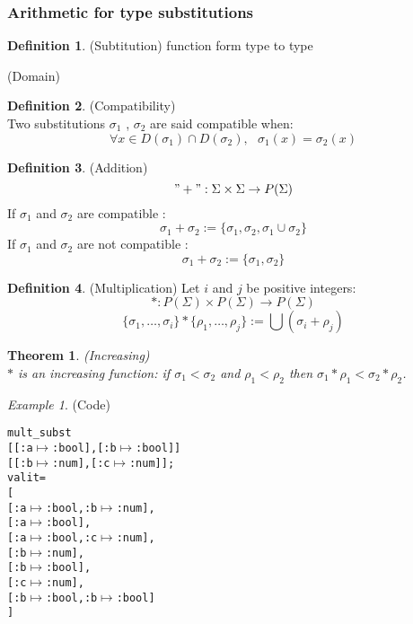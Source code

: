 \documentclass[a4paper, 11pt]{article}
\theoremstyle{plain}
\newtheorem*{thm}{Theorem}
\theoremstyle{definition}
\newtheorem*{mydef}{Definition}
\theoremstyle{remark}
\newtheorem*{example}{Example}
\begin{document}
\subsubsection{Arithmetic for type substitutions}
\begin{mydef} (Subtitution) 
  function form type to type
\end{mydef} 
 
 (Domain)   
  
\begin{mydef} (Compatibility)
\\Two substitutions $\sigma_1$ , $\sigma_2$ are said compatible when:
  \[\forall x \in D(\sigma_1) \cap D(\sigma_2),\mbox{ }
    \sigma_1(x) = \sigma_2(x) \]
\end{mydef}

\begin{mydef} (Addition)
\["+": \Sigma \times \Sigma \rightarrow P(\Sigma) \]
If $\sigma_1$ and $\sigma_2$ are compatible :
\[\sigma_1 + \sigma_2 := 
\lbrace \sigma_1, \sigma_2,\sigma_1 \cup \sigma_2 \rbrace \] 
If $\sigma_1$ and $\sigma_2$ are not compatible :
\[\sigma_1 + \sigma_2 := \lbrace \sigma_1,\sigma_2 \rbrace \]
\end{mydef}

\begin{mydef} (Multiplication)
Let $i$ and $j$ be positive integers:   
\[* : P(\Sigma) \times P(\Sigma) \rightarrow P(\Sigma) \]
\[
\lbrace \sigma_1, \ldots ,\sigma_i \rbrace *
\lbrace \rho_1, \ldots ,\rho_j \rbrace := 
\bigcup (\sigma_{i} +\rho_{j})
\]    
\end{mydef}  
  
\begin{thm} (Increasing)
\\$*$ is an increasing function:
if $ \sigma_1 < \sigma_2$ and $\rho_1 < \rho_2$ then $\sigma_1 * \rho_1 < \sigma_2 * \rho_2$.
\end{thm}  
  
\begin{example} (Code)
\begin{alltt}
mult_subst 
  [[:a \(\mapsto\) :bool], [:b \(\mapsto\) :bool]]
  [[:b \(\mapsto\) :num] , [:c \(\mapsto\) :num]];
val it = 
  [
 [{:a \(\mapsto\) :bool}, {:b \(\mapsto\) :num}],
 [{:a \(\mapsto\) :bool}],
 [{:a \(\mapsto\) :bool}, {:c \(\mapsto\) :num}],
 [{:b \(\mapsto\) :num}],
 [{:b \(\mapsto\) :bool}],
 [{:c \(\mapsto\) :num}],
 [{:b \(\mapsto\) :bool},{:b \(\mapsto\) :bool}]
  ] 
\end{alltt} 
\end{example}
  
\end{document}
